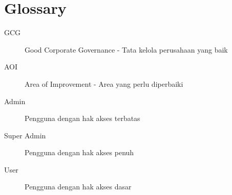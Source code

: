 \documentclass[12pt,a4paper]{article}
\begin{document}
\appendix
\section{Glossary}
\begin{description}
    \item[GCG] Good Corporate Governance - Tata kelola perusahaan yang baik
    \item[AOI] Area of Improvement - Area yang perlu diperbaiki
    \item[Admin] Pengguna dengan hak akses terbatas
    \item[Super Admin] Pengguna dengan hak akses penuh
    \item[User] Pengguna dengan hak akses dasar
\end{description}
\end{document}
